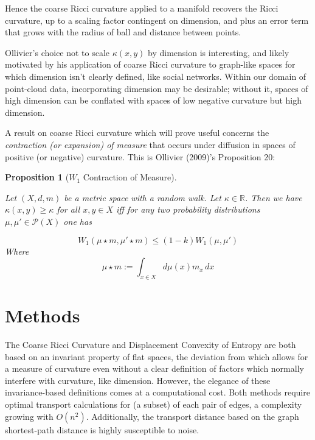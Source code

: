 \documentclass[
  letterpaper,
  DIV=11,
  numbers=noendperiod]{scrartcl}
\theoremstyle{plain}
\theoremstyle{plain}
\newtheorem{proposition}{Proposition}[section]
\theoremstyle{definition}
\theoremstyle{definition}
\theoremstyle{remark}
\begin{document}
Hence the coarse Ricci curvature applied to a manifold recovers the
Ricci curvature, up to a scaling factor contingent on dimension, and
plus an error term that grows with the radius of ball and distance
between points.

Ollivier's choice not to scale \(\kappa(x,y)\) by dimension is
interesting, and likely motivated by his application of coarse Ricci
curvature to graph-like spaces for which dimension isn't clearly
defined, like social networks. Within our domain of point-cloud data,
incorporating dimension may be desirable; without it, spaces of high
dimension can be conflated with spaces of low negative curvature but
high dimension.

A result on coarse Ricci curvature which will prove useful concerns the
\emph{contraction (or expansion) of measure} that occurs under diffusion
in spaces of positive (or negative) curvature. This is Ollivier (2009)'s
Proposition 20:

\begin{proposition}[\(W_1\) Contraction of
Measure]\protect\hypertarget{prp-ollivier-contraction-of-measure}{}\label{prp-ollivier-contraction-of-measure}

Let \((X,d,m)\) be a metric space with a random walk. Let
\(\kappa \in \mathbb{R}\). Then we have \(\kappa(x,y) \geq \kappa\) for
all \(x,y \in X\) iff for any two probability distributions
\(\mu, \mu' \in \mathcal{P}(X)\) one has

\[
W_{1}(\mu \star m, \mu' \star m) \leq (1-k)W_{1}(\mu, \mu')
\] Where \[
 \mu \star m := \int_{{x \in X}} d\mu(x)m_{x} \, dx
\]

\end{proposition}

\section{Methods}\label{methods}

The Coarse Ricci Curvature and Displacement Convexity of Entropy are
both based on an invariant property of flat spaces, the deviation from
which allows for a measure of curvature even without a clear definition
of factors which normally interfere with curvature, like dimension.
However, the elegance of these invariance-based definitions comes at a
computational cost. Both methods require optimal transport calculations
for (a subset) of each pair of edges, a complexity growing with
\(O(n^2)\). Additionally, the transport distance based on the graph
shortest-path distance is highly susceptible to noise.
\end{document}
